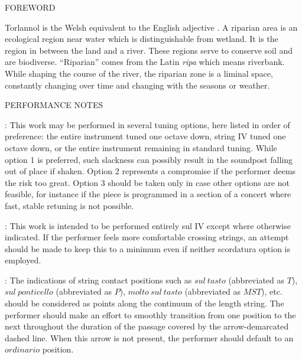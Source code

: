 \documentclass[11pt]{article}
\newcommand*\circled[1]{\tikz[baseline=(char.base)]{
            \node[shape=circle,draw,inner sep=1pt] (char) {#1};}}
\begin{document}
\begin{center}
\huge FOREWORD
\end{center}

\begingroup

\begin{center}
Torlannol is the Welsh equivalent to the English adjective . A riparian area is an ecological region near water which is distinguishable from wetland. It is the region in between the land and a river. These regions serve to conserve soil and are biodiverse. ``Riparian'' comes from the Latin \textit{ripa} which means riverbank. While shaping the course of the river, the riparian zone is a liminal space, constantly changing over time and changing with the seasons or weather.
\rightskip\leftskip
\phantom{text} \hfill \phantom{()}
\end{center}

\endgroup

\vspace*{1\baselineskip}

\begin{center}
\huge PERFORMANCE NOTES
\end{center}

 : This work may be performed in several tuning options, here listed in order of preference: \circled{1} the entire instrument tuned one octave down, \circled{2} string IV tuned one octave down, or \circled{3} the entire instrument remaining in standard tuning. While option 1 is preferred, such slackness can possibly result in the soundpost falling out of place if shaken. Option 2 represents a compromise if the performer deems the risk too great. Option 3 should be taken only in case other options are not feasible, for instance if the piece is programmed in a section of a concert where fast, stable retuning is not possible.
\rightskip\leftskip
\phantom{text} \hfill \phantom{()}

 : This work is intended to be performed entirely sul IV except where otherwise indicated. If the performer feels more comfortable crossing strings, an attempt should be made to keep this to a minimum even if neither scordatura option is employed.
\rightskip\leftskip
\phantom{text} \hfill \phantom{()}

 : The indications of string contact positions such as $sul \ tasto$ (abbreviated as $T$), $sul \ ponticello$ (abbreviated as $P$), $molto \ sul \ tasto$ (abbreviated as $MST$), etc. should be considered as points along the continuum of the length string. The performer should make an effort to smoothly transition from one position to the next throughout the duration of the passage covered by the arrow-demarcated dashed line. When this arrow is not present, the performer should default to an $ordinario$ position.
\rightskip\leftskip
\phantom{text} \hfill \phantom{()}
\end{document}
